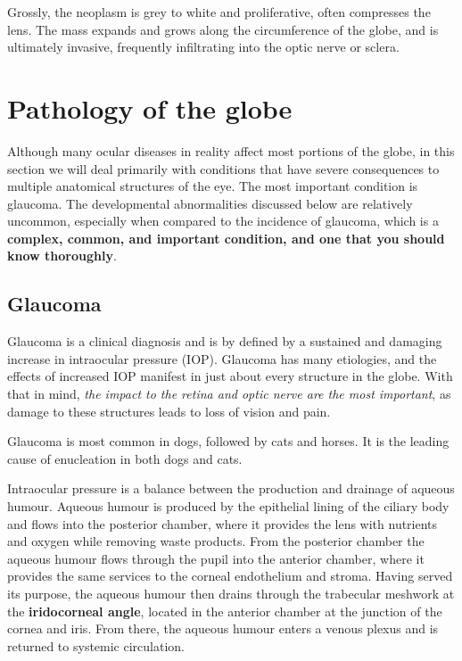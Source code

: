 \documentclass[
  openany]{article}
\begin{document}
Grossly, the neoplasm is grey to white and proliferative, often compresses the lens. The mass expands and grows along the circumference of the globe, and is ultimately invasive, frequently infiltrating into the optic nerve or sclera.

\hypertarget{pathology-of-the-globe}{%
\section{Pathology of the globe}\label{pathology-of-the-globe}}

Although many ocular diseases in reality affect most portions of the globe, in this section we will deal primarily with conditions that have severe consequences to multiple anatomical structures of the eye. The most important condition is glaucoma. The developmental abnormalities discussed below are relatively uncommon, especially when compared to the incidence of glaucoma, which is a \textbf{complex, common, and important condition, and one that you should know thoroughly}.

\hypertarget{glaucoma}{%
\subsection{Glaucoma}\label{glaucoma}}

Glaucoma is a clinical diagnosis and is by defined by a sustained and damaging increase in intraocular pressure (IOP). Glaucoma has many etiologies, and the effects of increased IOP manifest in just about every structure in the globe. With that in mind, \emph{the impact to the retina and optic nerve are the most important}, as damage to these structures leads to loss of vision and pain.

Glaucoma is most common in dogs, followed by cats and horses. It is the leading cause of enucleation in both dogs and cats.

Intraocular pressure is a balance between the production and drainage of aqueous humour. Aqueous humour is produced by the epithelial lining of the ciliary body and flows into the posterior chamber, where it provides the lens with nutrients and oxygen while removing waste products. From the posterior chamber the aqueous humour flows through the pupil into the anterior chamber, where it provides the same services to the corneal endothelium and stroma. Having served its purpose, the aqueous humour then drains through the trabecular meshwork at the \textbf{iridocorneal angle}, located in the anterior chamber at the junction of the cornea and iris. From there, the aqueous humour enters a venous plexus and is returned to systemic circulation.
\end{document}
